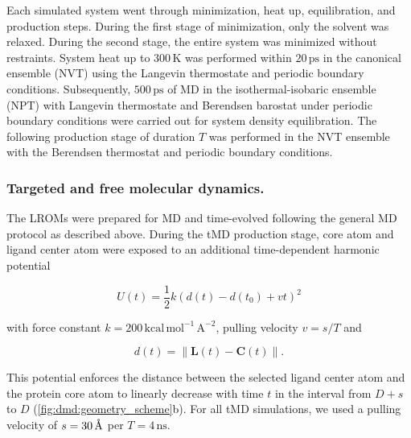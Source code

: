 Each simulated system went through minimization, heat up, equilibration, and
production steps. During the first stage of minimization, only the solvent was
relaxed. During the second stage, the entire system was minimized without
restraints. System heat up to $300\,\mathrm{K}$ was performed within
$20\,\mathrm{ps}$ in the canonical ensemble (NVT) using the Langevin thermostate
and periodic boundary conditions. Subsequently, $500\,\mathrm{ps}$ of MD in the
isothermal-isobaric ensemble (NPT) with Langevin thermostate and Berendsen
barostat under periodic boundary conditions were carried out for system density
equilibration. The following production stage of duration $T$ was performed in
the NVT ensemble with the Berendsen thermostat and periodic boundary conditions.


\subsubsection{Targeted and free molecular dynamics.}
The LROMs were prepared for MD and time-evolved following the general MD
protocol as described above. During the tMD production stage, core atom and
ligand center atom were exposed to an additional time-dependent harmonic
potential

\begin{equation}
U(t) = \frac{1}{2} k \left( d(t)-d(t_0) + vt   \right)^2
\end{equation}

with force constant $k=200\,\mathrm{kcal\,mol^{-1}\,A^{-2}}$, pulling velocity
$ v = s/T$ and

\begin{equation}
d(t) = \lVert \bm{L}(t)-\bm{C}(t) \rVert.
\end{equation}

This potential enforces the distance between the selected ligand center atom and
the protein core atom to linearly decrease with time $t$ in the interval from
$D+s$ to $D$ (\cref{fig:dmd:geometry_scheme}b). For all tMD simulations, we used
a pulling velocity of $s=30\,\textup{\AA}$ per $T=4\,\mathrm{ns}$.

